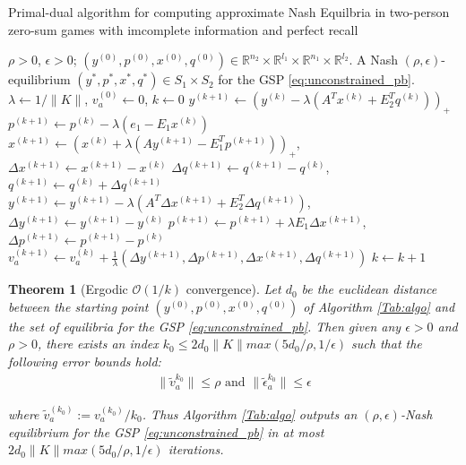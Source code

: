 \documentclass{article} %
\newtheorem{theorem}{Theorem} \newtheorem{lemma}[theorem]{Lemma}
\begin{document}
\begin{algorithm}
\label{Tab:algo}
\caption{Primal-dual algorithm for computing approximate Nash
  Equilbria in two-person zero-sum games with imcomplete information
  and perfect recall}
\begin{algorithmic}[1]
\Require $\rho >0$, $\epsilon > 0$; $(y^{(0)},p^{(0)},x^{(0)},q^{(0)})
\in \mathbb{R}^{n_2}
  \times \mathbb{R}^{l_1} \times \mathbb{R}^{n_1} \times
  \mathbb{R}^{l_2}$.
\Ensure A Nash $(\rho, \epsilon)$-equilibrium
$({y^*},{p^*},{x^*},{q^*}) \in S_1 \times S_2$ for
the GSP \eqref{eq:unconstrained_pb}.
\State  $\lambda \leftarrow 1/\|K\|$, ${v}_a^{(0)} \leftarrow 0$, $k
\leftarrow 0$
\State $y^{(k + 1)} \leftarrow (y^{(k)} - \lambda (A^Tx^{(k)} +
E_2^Tq^{(k)}))_+$
\State  $p^{(k+1)} \leftarrow p^{(k)} -
\lambda(e_1-E_1x^{(k)})$
\State $x^{(k + 1)} \leftarrow (x^{(k)} + \lambda (Ay^{(k+1)} -
E_1^Tp^{(k+1)}))_+$, \hspace{.5em}$\Delta x^{(k+1)} \leftarrow
x^{(k+1)}-x^{(k)}$
\State $\Delta q^{(k+1)} \leftarrow
q^{(k+1)}-q^{(k)}$, \hspace{.5em}$q^{(k+1)}
\leftarrow q^{(k)} + \Delta q^{(k+1)}$
\State $y^{(k+1)} \leftarrow y^{(k+1)} - \lambda (A^T\Delta x^{(k+1)}
+ E_2^T\Delta q^{(k+1)})$, \hspace{.5em}$\Delta y^{(k+1)} \leftarrow
y^{(k+1)}-y^{(k)}$
\State $p^{(k+1)} \leftarrow p^{(k+1)} + \lambda E_1\Delta x^{(k+1)}$,
\hspace{.5em} $\Delta p^{(k+1)} \leftarrow p^{(k+1)}-p^{(k)}$
\State ${v}_a^{(k+1)} \leftarrow {v}_a^{(k)} +
\frac{1}{\lambda}(\Delta
y^{(k+1)},\Delta p^{(k+1)},\Delta x^{(k+1)},\Delta q^{(k+1)})$
\State $k \leftarrow k + 1$
\EndWhile
\end{algorithmic}
\end{algorithm}

\begin{theorem}[Ergodic $\mathcal{O}(1/k)$ convergence]
Let $d_0$ be the euclidean distance between the starting point
$(y^{(0)},p^{(0)},x^{(0)},q^{(0)})$ of Algorithm \ref{Tab:algo} and the
set of equilibria for the GSP \eqref{eq:unconstrained_pb}.
Then given any $\epsilon > 0$ and $\rho > 0$, there exists an index
$k_0 \le 2d_0\|K\|max(5d_0/\rho, 1/\epsilon)$ such that the following
error bounds hold:
\begin{eqnarray}
\|\tilde{v}_a^{k_0}\| \le \rho \text{ and }
\|\tilde{\epsilon}_a^{k_0}\| \le \epsilon
\end{eqnarray}

where $\tilde{v}_a^{(k_0)} := v_a^{(k_0)}/k_0$.
Thus Algorithm \ref{Tab:algo} outputs an $(\rho,\epsilon)$-Nash
equilibrium for the GSP \eqref{eq:unconstrained_pb}
in at most $2d_0\|K\|max(5d_0/\rho, 1/\epsilon)$ iterations.
\end{theorem}
\end{document}
